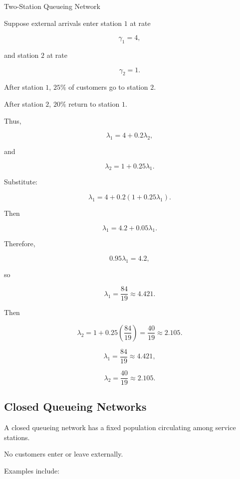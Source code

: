 \begin{workedexamplebox}{Two-Station Queueing Network}

Suppose external arrivals enter station \(1\) at rate

\[
\gamma_1=4,
\]

and station \(2\) at rate

\[
\gamma_2=1.
\]

After station \(1\), \(25\%\) of customers go to station \(2\).

After station \(2\), \(20\%\) return to station \(1\).

Thus,

\[
\lambda_1
=
4
+
0.2\lambda_2,
\]

and

\[
\lambda_2
=
1
+
0.25\lambda_1.
\]

Substitute:

\[
\lambda_1
=
4
+
0.2
\left(
1+0.25\lambda_1
\right).
\]

Then

\[
\lambda_1
=
4.2
+
0.05\lambda_1.
\]

Therefore,

\[
0.95\lambda_1
=
4.2,
\]

so

\[
\lambda_1
=
\frac{84}{19}
\approx4.421.
\]

Then

\[
\lambda_2
=
1
+
0.25
\left(
\frac{84}{19}
\right)
=
\frac{40}{19}
\approx2.105.
\]

\begin{answerbox}
\[
\boxed{
\lambda_1
=
\frac{84}{19}
\approx4.421,
}
\]

\[
\boxed{
\lambda_2
=
\frac{40}{19}
\approx2.105.
}
\]
\end{answerbox}

\end{workedexamplebox}

\subsection{Closed Queueing Networks}
\label{subsec:closed-queueing-networks}

A closed queueing network has a fixed population circulating among service
stations.

No customers enter or leave externally.

Examples include:

